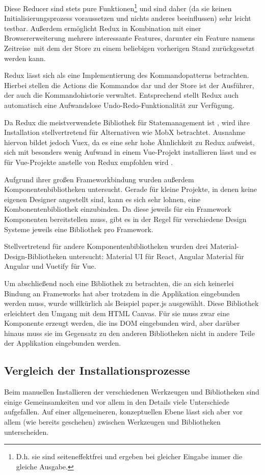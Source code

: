 Diese Reducer sind stets pure Funktionen\footnote{D.h. sie sind seiteneffektfrei und ergeben bei gleicher Eingabe immer die gleiche Ausgabe.} und sind daher (da sie keinen Initialisierungsprozess voraussetzen und nichts anderes beeinflussen) sehr leicht testbar. Außerdem ermöglicht Redux in Kombination mit einer Browsererweiterung mehrere interessante Features, darunter ein Feature namens \glqq Zeitreise\grqq\, mit dem der Store zu einem beliebigen vorherigen Stand zurückgesetzt werden kann.

Redux lässt sich als eine Implementierung des Kommandopatterns betrachten. Hierbei stellen die Actions die Kommandos dar und der Store ist der Ausführer, der auch die Kommandohistorie verwaltet. Entsprechend stellt Redux auch automatisch eine Aufwandslose Undo-Redo-Funktionalität zur Verfügung.

Da Redux die meistverwendete Bibliothek für Statemanagement ist \cite{stateofjs}, wird ihre Installation stellvertretend für Alternativen wie MobX betrachtet. Ausnahme hiervon bildet jedoch Vuex, da es eine sehr hohe Ähnlichkeit zu Redux aufweist, sich mit besonders wenig Aufwand in einem Vue-Projekt installieren lässt und es für Vue-Projekte anstelle von Redux empfohlen wird \cite{vuejs_docs:redux_vs_vuex}.

Aufgrund ihrer großen Frameworkbindung wurden außerdem Komponentenbibliotheken untersucht. Gerade für kleine Projekte, in denen keine eigenen Designer angestellt sind, kann es sich sehr lohnen, eine Kombonentenbibliothek einzubinden. Da diese jeweils für ein Framework Komponenten bereitstellen muss, gibt es in der Regel für verschiedene Design Systeme jeweils eine Bibliothek pro Framework.

Stellvertretend für andere Komponentenbibliotheken wurden drei Material-Design-Bibliotheken untersucht: Material UI für React, Angular Material für Angular und Vuetify für Vue.

Um abschließend noch eine Bibliothek zu betrachten, die an sich keinerlei Bindung an Frameworks hat aber trotzdem in die Applikation eingebunden werden muss, wurde willkürlich als Beispiel paper.js ausgewählt. Diese Bibliothek erleichtert den Umgang mit dem HTML Canvas. Für sie muss zwar eine Komponente erzeugt werden, die ins \gls{DOM} eingebunden wird, aber darüber hinaus muss sie im Gegensatz zu den anderen Bibliotheken nicht in andere Teile der Applikation eingebunden werden.

\subsection{Vergleich der Installationsprozesse}
Beim manuellen Installieren der verschiedenen Werkzeugen und Bibliotheken sind einige Gemeinsamkeiten und vor allem in den Details viele Unterschiede aufgefallen. Auf einer allgemeineren, konzeptuellen Ebene lässt sich aber vor allem (wie bereits geschehen) zwischen Werkzeugen und Bibliotheken unterscheiden.

